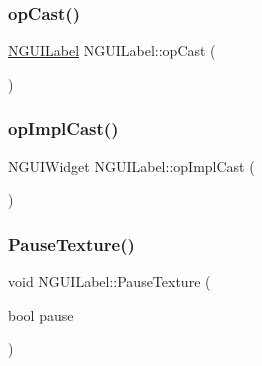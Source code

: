 \hypertarget{class_n_g_u_i_label_aa75ddad519625ffd41f1606754bb6754}{}\label{class_n_g_u_i_label_aa75ddad519625ffd41f1606754bb6754} 
\subsubsection{\texorpdfstring{op\+Cast()}{opCast()}}
{\footnotesize\ttfamily \hyperlink{class_n_g_u_i_label}{N\+G\+U\+I\+Label} N\+G\+U\+I\+Label\+::op\+Cast (\begin{DoxyParamCaption}{ }\end{DoxyParamCaption})}

\hypertarget{class_n_g_u_i_label_a93fe70bfa635afdd09250434cdd454c2}{}\label{class_n_g_u_i_label_a93fe70bfa635afdd09250434cdd454c2} 
\subsubsection{\texorpdfstring{op\+Impl\+Cast()}{opImplCast()}}
{\footnotesize\ttfamily N\+G\+U\+I\+Widget N\+G\+U\+I\+Label\+::op\+Impl\+Cast (\begin{DoxyParamCaption}{ }\end{DoxyParamCaption})}

\hypertarget{class_n_g_u_i_label_a14745d93fbea4ec1f73b2f1e67588773}{}\label{class_n_g_u_i_label_a14745d93fbea4ec1f73b2f1e67588773} 
\subsubsection{\texorpdfstring{Pause\+Texture()}{PauseTexture()}}
{\footnotesize\ttfamily void N\+G\+U\+I\+Label\+::\+Pause\+Texture (\begin{DoxyParamCaption}\item[{bool}]{pause }\end{DoxyParamCaption})}

\hypertarget{class_n_g_u_i_label_a4b2ffa731f4162c7f03cf3281791e841}{}\label{class_n_g_u_i_label_a4b2ffa731f4162c7f03cf3281791e841} 
